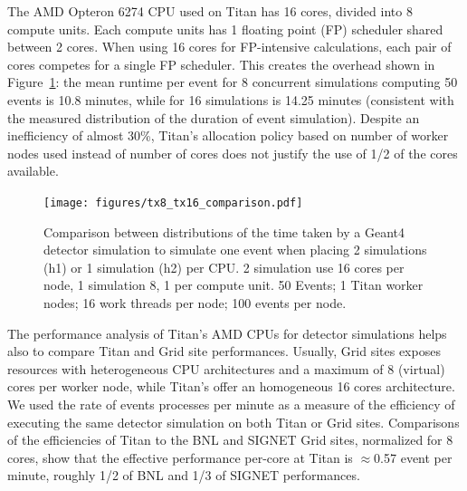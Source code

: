 

The AMD Opteron 6274 CPU used on Titan has 16 cores, divided into 8 compute
units. Each compute units has 1 floating point (FP) scheduler shared between 2
cores. When using 16 cores for FP-intensive calculations, each pair of cores
competes for a single FP scheduler. This creates the overhead shown in
Figure~\ref{fig:comparison-8-16cores}: the mean runtime per event for 8
concurrent simulations computing 50 events is 10.8 minutes, while for 16
simulations is 14.25 minutes (consistent with the measured distribution of the
duration of event simulation). Despite an inefficiency of almost 30\%, Titan's
allocation policy based on number of worker nodes used instead of number of
cores does not justify the use of 1/2 of the cores available.

\begin{figure}[htp]
    \texttt{[image: figures/tx8\_tx16\_comparison.pdf]}
    \caption{Comparison between distributions of the time taken by a Geant4
    detector simulation to simulate one event when placing 2 simulations (h1) or
    1 simulation (h2) per CPU. 2 simulation use 16 cores per node, 1 simulation
    8, 1 per compute unit. 50 Events; 1 Titan worker nodes; 16 work threads per
    node; 100 events per node.}
\label{fig:comparison-8-16cores}
\end{figure}

The performance analysis of Titan's AMD CPUs for detector simulations helps also
to compare Titan and Grid site performances. Usually, Grid sites exposes
resources with heterogeneous CPU architectures and a maximum of 8 (virtual)
cores per worker node, while Titan's offer an homogeneous 16 cores architecture.
We used the rate of events processes per minute as a measure of the efficiency
of executing the same detector simulation on both Titan or Grid sites.
Comparisons of the efficiencies of Titan to  the BNL and SIGNET Grid sites,
normalized for 8 cores, show that the effective performance per-core at Titan is
$\approx$0.57 event per minute, roughly 1/2 of BNL and  1/3 of SIGNET
performances.


